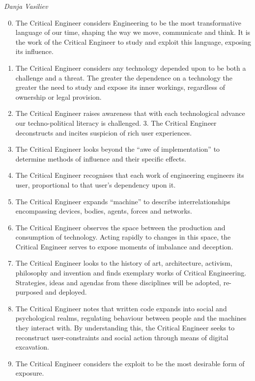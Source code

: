 \documentclass[letterpaper,12pt,english]{sphinxmanual}
\begin{document}
\emph{Danja Vasiliev}
\begin{enumerate}
\setcounter{enumi}{-1}
\item {} 
The Critical Engineer considers Engineering to be the most transformative language of our time, shaping the way we move, communicate and think. It is the work of the Critical Engineer to study and exploit this language, exposing its influence.

\item {} 
The Critical Engineer considers any technology depended upon to be both a challenge and a threat. The greater the dependence on a technology the greater the need to study and expose its inner workings, regardless of ownership or legal provision.

\item {} 
The Critical Engineer raises awareness that with each technological advance our techno-political literacy is challenged. 3. The Critical Engineer deconstructs and incites suspicion of rich user experiences.

\item {} 
The Critical Engineer looks beyond the ``awe of implementation'' to determine methods of influence and their specific effects.

\item {} 
The Critical Engineer recognises that each work of engineering engineers its user, proportional to that user's dependency upon it.

\item {} 
The Critical Engineer expands ``machine'' to describe interrelationships encompassing devices, bodies, agents, forces and networks.

\item {} 
The Critical Engineer observes the space between the production and consumption of technology. Acting rapidly to changes in this space, the Critical Engineer serves to expose moments of imbalance and deception.

\item {} 
The Critical Engineer looks to the history of art, architecture, activism, philosophy and invention and finds exemplary works of Critical Engineering. Strategies, ideas and agendas from these disciplines will be adopted, re-purposed and deployed.

\item {} 
The Critical Engineer notes that written code expands into social and psychological realms, regulating behaviour between people and the machines they interact with. By understanding this, the Critical Engineer seeks to reconstruct user-constraints and social action through means of digital excavation.

\item {} 
The Critical Engineer considers the exploit to be the most desirable form of exposure.

\end{enumerate}
\end{document}
